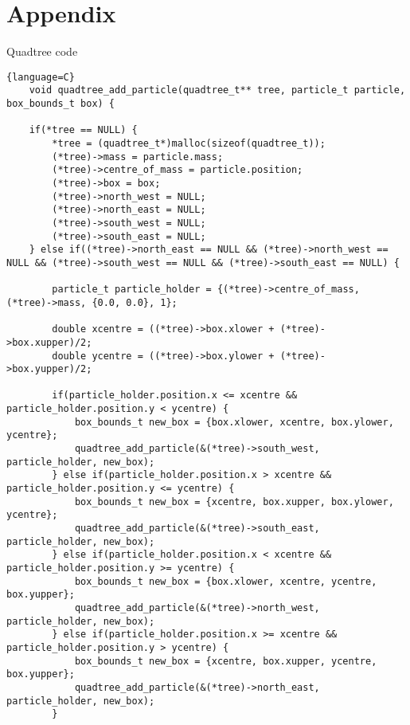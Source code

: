 \section{Appendix}
\begin{center}
    Quadtree code
\end{center}
\begin{lstlisting}{language=C}
    void quadtree_add_particle(quadtree_t** tree, particle_t particle, box_bounds_t box) {

    if(*tree == NULL) {
        *tree = (quadtree_t*)malloc(sizeof(quadtree_t));
        (*tree)->mass = particle.mass;
        (*tree)->centre_of_mass = particle.position;
        (*tree)->box = box;
        (*tree)->north_west = NULL;
        (*tree)->north_east = NULL;
        (*tree)->south_west = NULL;
        (*tree)->south_east = NULL;
    } else if((*tree)->north_east == NULL && (*tree)->north_west == NULL && (*tree)->south_west == NULL && (*tree)->south_east == NULL) {

        particle_t particle_holder = {(*tree)->centre_of_mass, (*tree)->mass, {0.0, 0.0}, 1};

        double xcentre = ((*tree)->box.xlower + (*tree)->box.xupper)/2;
        double ycentre = ((*tree)->box.ylower + (*tree)->box.yupper)/2;

        if(particle_holder.position.x <= xcentre && particle_holder.position.y < ycentre) {
            box_bounds_t new_box = {box.xlower, xcentre, box.ylower, ycentre};
            quadtree_add_particle(&(*tree)->south_west, particle_holder, new_box);
        } else if(particle_holder.position.x > xcentre && particle_holder.position.y <= ycentre) {
            box_bounds_t new_box = {xcentre, box.xupper, box.ylower, ycentre};
            quadtree_add_particle(&(*tree)->south_east, particle_holder, new_box);
        } else if(particle_holder.position.x < xcentre && particle_holder.position.y >= ycentre) {
            box_bounds_t new_box = {box.xlower, xcentre, ycentre, box.yupper};
            quadtree_add_particle(&(*tree)->north_west, particle_holder, new_box);
        } else if(particle_holder.position.x >= xcentre && particle_holder.position.y > ycentre) {
            box_bounds_t new_box = {xcentre, box.xupper, ycentre, box.yupper};
            quadtree_add_particle(&(*tree)->north_east, particle_holder, new_box);
        }


\end{lstlisting}
